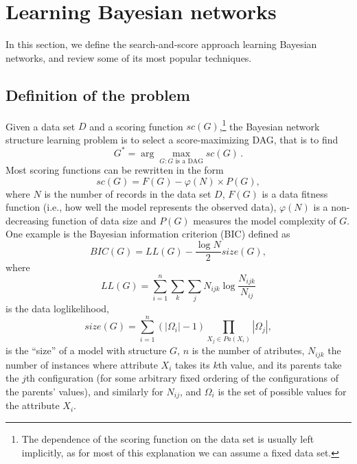 \section{Learning Bayesian networks}
\label{sec:learning}

In this section, we define the search-and-score approach learning
Bayesian networks, and review some of its most popular techniques.

\subsection{Definition of the problem}
\label{subsec:definition}

Given a data set $D$ and a scoring function ${sc}(G)$,\footnote{The dependence of the scoring function on the data set is usually left implicitly, as for most of this explanation we can assume a fixed data set.} the Bayesian network structure learning problem is to select a score-maximizing DAG, that is to find
\begin{equation} \label{optimal}
  G^* = \arg\max_{G: G \text{ is a DAG}} {sc}( G ) \, .
\end{equation}
Most scoring functions can be rewritten in the form
	\begin{equation}
		\label{eq:scoringfunction}
		{sc}( G ) = F( G ) - \varphi( N ) \times P( G ) ,
	\end{equation}
where $N$ is the number of records in the data set $D$, $F( G )$ is a data fitness function (i.e., how well the model represents the observed data), $\varphi( N )$ is a non-decreasing function of data size and $P( G )$ measures the model complexity of $G$. One example is the Bayesian information criterion (BIC) defined as
	\begin{equation}
		\label{eq:bicscore}
		{BIC}( G ) = {LL}( G ) - \frac{\log N}{2} {size}( G ) ,
	\end{equation}
where
	\begin{equation}
		\label{eq:dataloglikelihood}
		{LL}( G ) = \sum_{i=1}^{n} \sum_{k} \sum_{j} N_{ijk} \log \frac{N_{ijk}}{N_{ij}}
	\end{equation}
is the data loglikelihood, 
	\begin{equation}
		\label{eq:size}
		{size}( G ) = \sum_{i=1}^{n} ( |\Omega_i| - 1 ) \prod_{X_j \in {Pa}( X_i )} |\Omega_j| ,
	\end{equation}
is the ``size'' of a model with structure $G$, $n$ is the number of atributes, $N_{ijk}$ the number of instances where attribute $X_i$ takes its $k$th value, and its parents take the $j$th configuration (for some arbitrary fixed ordering of the configurations of the parents' values), and similarly  for $N_{ij}$, and $\Omega_i$ is the set of possible values for the attribute $X_i$.
